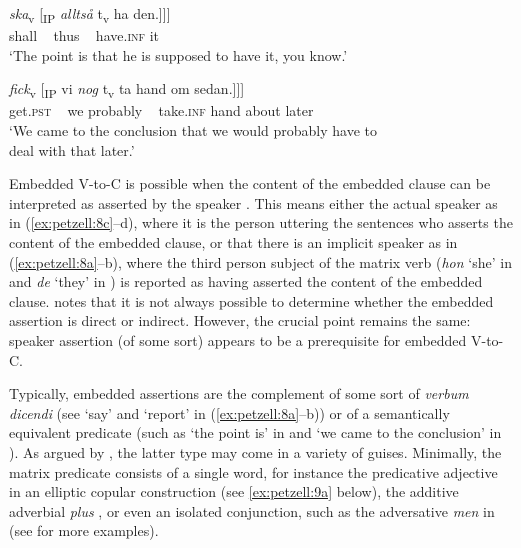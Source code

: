 \documentclass[output=paper,colorlinks,citecolor=brown,draft,draftmode]{langscibook}
\begin{document}
\gll     \textit{{ska}}\textsubscript{v}      [\textsubscript{IP} \textit{{alltså}}  t\textsubscript{v}    ha        den.]]]  \\
    shall     ~     thus   ~    have.\textsc{inf}    it\\
\glt `The point is that he is supposed to have it, you know.’  \\

\ex{\label{ex:petzell:8d}
\gll Vi    drog      slutsatsen [\textsubscript{CP}    att [\textsubscript{CP}     den\\
    we    draw.\textsc{pst}  conclusion.\textsc{def} ~ that    ~   it   \\}

\gll     \textit{{fick}}\textsubscript{v} [\textsubscript{IP}  vi    \textit{{nog}} t\textsubscript{v}     ta      hand  om    sedan.]]]  \\
    get.\textsc{pst} ~ we    probably ~ take.\textsc{inf}  hand   about    later\\
\glt `We came to the conclusion that we would probably have to   \\
    deal with that later.’
\z
\z


Embedded V-to-C is possible when the content of the embedded clause can be interpreted as asserted by the speaker \citep[21]{Andersson1975}. This means either the actual speaker as in (\ref{ex:petzell:8c}–d), where it is the person uttering the sentences who asserts the content of the embedded clause, or that there is an implicit speaker as in (\ref{ex:petzell:8a}–b), where the third person subject of the matrix verb (\textit{hon} ‘she’ in  and \textit{de} ‘they’ in ) is reported as having asserted the content of the embedded clause. \citet[164–167]{Julien2015} notes that it is not always possible to determine whether the embedded assertion is direct or indirect. However, the crucial point remains the same: speaker assertion (of some sort) appears to be a prerequisite for embedded V-to-C.



Typically, embedded assertions are the complement of some sort of \textit{verbum dicendi} (see ‘say’ and ‘report’ in (\ref{ex:petzell:8a}–b)) or of a semantically equivalent predicate (such as ‘the point is’ in  and ‘we came to the conclusion’ in ). As argued by \citet{Julien2009}, the latter type may come in a variety of guises. Minimally, the matrix predicate consists of a single word, for instance the predicative adjective in an elliptic copular construction (see \ref{ex:petzell:9a} below), the additive adverbial \textit{plus} , or even an isolated conjunction, such as the adversative \textit{men} in  (see \citealt{Lyngfelt2003} for more examples).
\end{document}
